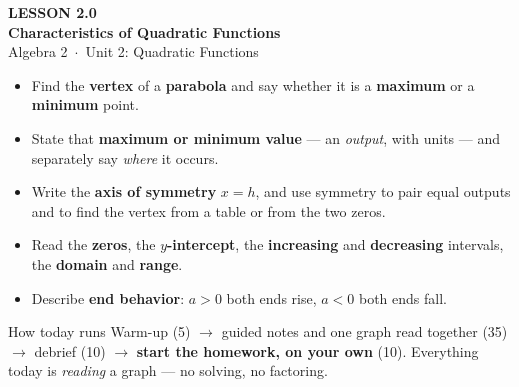 \documentclass[aspectratio=169, 11pt]{beamer}
\begin{document}
{
\begin{frame}[plain]
  \vspace{2.8cm}\hspace{0.55cm}%
  \begin{minipage}{0.9\textwidth}
    {\color{goldacc}\bfseries\small LESSON 2.0}\\[0.5cm]
    {\color{white}\bfseries\LARGE Characteristics of Quadratic Functions}\\[1.2cm]
    {\color{forestmid}\small Algebra 2~$\cdot$~Unit 2: Quadratic Functions}
  \end{minipage}
\end{frame}
}

\begin{frame}[t, plain]
  \begin{itemize}\setlength{\itemsep}{5pt}
    \item Find the \textbf{vertex} of a \textbf{parabola} and say whether it is a
          \textbf{maximum} or a \textbf{minimum} point.
    \item State that \textbf{maximum or minimum value} --- an \emph{output}, with units --- and
          separately say \emph{where} it occurs.
    \item Write the \textbf{axis of symmetry} $x=h$, and use symmetry to pair equal outputs and
          to find the vertex from a table or from the two zeros.
    \item Read the \textbf{zeros}, the \textbf{$y$-intercept}, the \textbf{increasing} and
          \textbf{decreasing} intervals, the \textbf{domain} and \textbf{range}.
    \item Describe \textbf{end behavior}: $a>0$ both ends rise, $a<0$ both ends fall.
  \end{itemize}
  \vspace{4pt}
  \begin{block}{How today runs}
    Warm-up (5) $\to$ guided notes and one graph read together (35) $\to$ debrief (10) $\to$
    \textbf{start the homework, on your own} (10). Everything today is \emph{reading} a graph ---
    no solving, no factoring.
  \end{block}
\end{frame}
\end{document}
